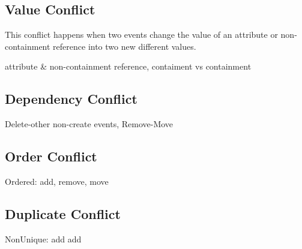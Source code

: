 \subsection{Value Conflict}
This conflict happens when two events change the value of an attribute or non-containment reference into two new different values. 

attribute \& non-containment reference, contaiment vs containment

\subsection{Dependency Conflict}
Delete-other non-create events, Remove-Move

\subsection{Order Conflict}
Ordered: add, remove, move

\subsection{Duplicate Conflict}
NonUnique: add add


